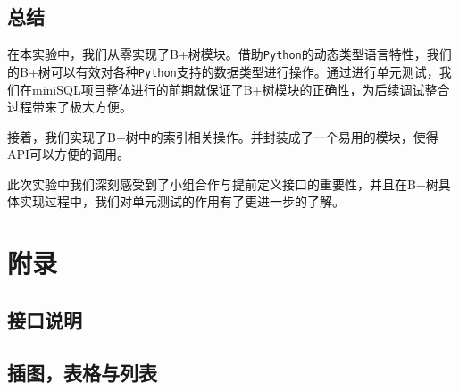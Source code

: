 \documentclass[UTF8]{ctexrep} %
\begin{document}
\chapter{总结}
在本实验中，我们从零实现了B+树模块。借助\texttt{Python}的动态类型语言特性，我们的B+树可以有效对各种\texttt{Python}支持的数据类型进行操作。通过进行单元测试，我们在miniSQL项目整体进行的前期就保证了B+树模块的正确性，为后续调试整合过程带来了极大方便。
\par
接着，我们实现了B+树中的索引相关操作。并封装成了一个易用的模块，使得API可以方便的调用。
\par
此次实验中我们深刻感受到了小组合作与提前定义接口的重要性，并且在B+树具体实现过程中，我们对单元测试的作用有了更进一步的了解。


\newpage
\part{附录}


\begin{appendices}
\chapter{接口说明}

\chapter{插图，表格与列表}
\listoffigures
\listoflistings
\end{appendices}
\end{document}
